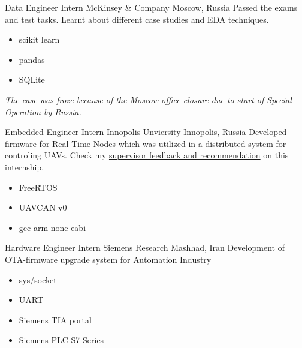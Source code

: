         {Data Engineer Intern}
        {McKinsey \& Company}
        {Moscow, Russia}
        {
        \newline
        Passed the exams and test tasks.
        Learnt about different case studies and EDA techniques.
        } 
        {
        \begin{itemize}
            \item scikit learn
            \item pandas
            \item SQLite
        \end{itemize}
        \textit{The case was froze because of the Moscow office closure due to start of Special Operation by Russia.}
        }
        

        {Embedded Engineer Intern}
        {Innopolis Unviersity}
        {Innopolis, Russia}
        {
        \newline
        Developed firmware for Real-Time Nodes which was utilized in a distributed system for controling UAVs. Check my \href{https://drive.google.com/file/d/1Msw5tk7niDSDpVlNeaLCsUIQxlgREYcV/edit?disco=AAAAl5Y7Zx0}{\color{blue} supervisor feedback and recommendation} on this internship.
        }
        {
        \begin{itemize}
            \item FreeRTOS
            \item UAVCAN v0
            \item gcc-arm-none-eabi
        \end{itemize}
        }


        {Hardware Engineer Intern}
        {Siemens Research}
        {Mashhad, Iran}
        {
        \newline
        Development of OTA-firmware upgrade system for Automation Industry} 
        {
        \begin{itemize}
            \item sys/socket
            \item UART
            \item Siemens TIA portal 
            \item Siemens PLC S7 Series
        \end{itemize}
        }


